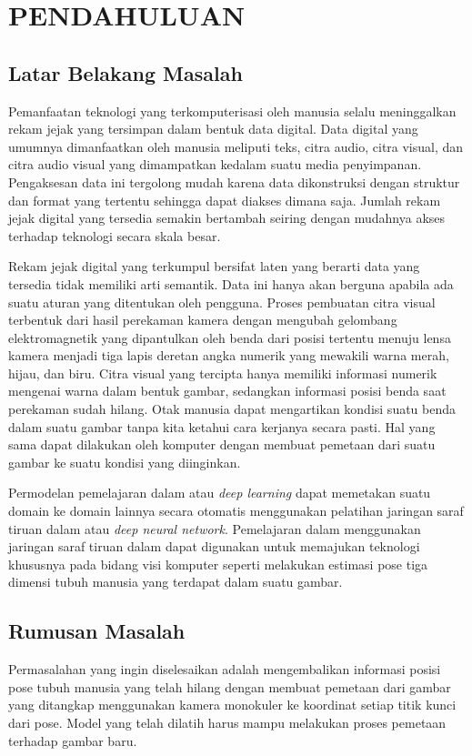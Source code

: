 
\chapter{PENDAHULUAN}
\label{cha:1-Pendahuluan}

\section{Latar Belakang Masalah}
\label{sec:1-LatarBelakangMasalah}

Pemanfaatan teknologi yang terkomputerisasi oleh manusia selalu meninggalkan rekam jejak yang
tersimpan dalam bentuk data digital. Data digital yang umumnya dimanfaatkan oleh manusia
meliputi teks, citra audio, citra visual, dan citra audio visual yang dimampatkan kedalam suatu
media penyimpanan. Pengaksesan data ini tergolong mudah karena data dikonstruksi dengan struktur
dan format yang tertentu sehingga dapat diakses dimana saja. Jumlah rekam jejak digital yang tersedia
semakin bertambah seiring dengan mudahnya akses terhadap teknologi secara skala besar.

Rekam jejak digital yang terkumpul bersifat laten yang berarti data yang tersedia tidak
memiliki arti semantik. Data ini hanya akan berguna apabila ada suatu aturan yang ditentukan
oleh pengguna. Proses pembuatan citra visual terbentuk dari hasil perekaman kamera dengan mengubah
gelombang elektromagnetik yang dipantulkan oleh benda dari posisi tertentu menuju lensa kamera
menjadi tiga lapis deretan angka numerik yang mewakili warna merah, hijau, dan biru. Citra visual
yang tercipta hanya memiliki informasi numerik mengenai warna dalam bentuk gambar, sedangkan
informasi posisi benda saat perekaman sudah hilang. Otak manusia dapat mengartikan kondisi suatu
benda dalam suatu gambar tanpa kita ketahui cara kerjanya secara pasti. Hal yang sama dapat
dilakukan oleh komputer dengan membuat pemetaan dari suatu gambar ke suatu kondisi yang diinginkan.

Permodelan pemelajaran dalam atau \textit{deep learning} dapat memetakan suatu domain ke
domain lainnya secara otomatis menggunakan pelatihan jaringan saraf tiruan dalam atau
\textit{deep neural network}. Pemelajaran dalam menggunakan jaringan
saraf tiruan dalam dapat digunakan untuk memajukan teknologi khususnya pada bidang visi komputer
seperti melakukan estimasi pose tiga dimensi tubuh manusia yang terdapat dalam suatu gambar.

\section{Rumusan Masalah}
\label{sec:1-RumusanMasalah}
Permasalahan yang ingin diselesaikan adalah mengembalikan informasi posisi pose tubuh manusia yang
telah hilang dengan membuat pemetaan dari gambar yang ditangkap menggunakan kamera monokuler ke
koordinat setiap titik kunci dari pose. Model yang telah dilatih harus mampu melakukan proses
pemetaan terhadap gambar baru.


